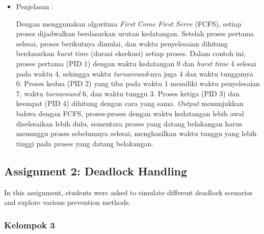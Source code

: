 \documentclass[12pt]{article}
\begin{document}
\begin{itemize}
    \item Penjelasan :

    Dengan menggunakan algoritma \textit{First Come First Serve} (FCFS), setiap proses dijadwalkan berdasarkan urutan kedatangan. Setelah proses pertama selesai, proses berikutnya dimulai, dan waktu penyelesaian dihitung berdasarkan \textit{burst time} (durasi eksekusi) setiap proses. Dalam contoh ini, proses pertama (PID 1) dengan waktu kedatangan 0 dan \textit{burst time} 4 selesai pada waktu 4, sehingga waktu \textit{turnaround}-nya juga 4 dan waktu tunggunya 0. Proses kedua (PID 2) yang tiba pada waktu 1 memiliki waktu penyelesaian 7, waktu \textit{turnaround} 6, dan waktu tunggu 3. Proses ketiga (PID 3) dan keempat (PID 4) dihitung dengan cara yang sama. \textit{Output} menunjukkan bahwa dengan FCFS, proses-proses dengan waktu kedatangan lebih awal diselesaikan lebih dulu, sementara proses yang datang belakangan harus menunggu proses sebelumnya selesai, menghasilkan waktu tunggu yang lebih tinggi pada proses yang datang belakangan.
\end{itemize}

\subsection{Assignment 2: Deadlock Handling}
In this assignment, students were asked to simulate different deadlock scenarios and explore various prevention methods.
\subsubsection{Kelompok 3}
\end{document}
